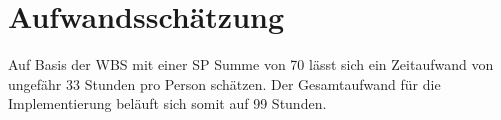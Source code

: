 \section{Aufwandsschätzung}

Auf Basis der WBS mit einer SP Summe von 70 lässt sich ein Zeitaufwand von ungefähr 33 Stunden pro Person schätzen.
Der Gesamtaufwand für die Implementierung beläuft sich somit auf 99 Stunden.
